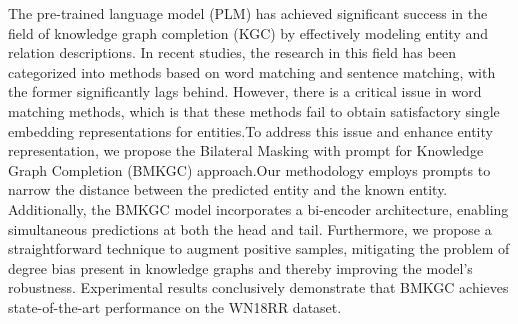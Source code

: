 The pre-trained language model (PLM) has achieved significant success in the field of knowledge graph completion (KGC) by effectively modeling entity and relation descriptions. In recent studies, the research in this field has been categorized into methods based on word matching and sentence matching, with the former significantly lags behind. However, there is a critical issue in word matching methods, which is that these methods fail to obtain satisfactory single embedding representations for entities.To address this issue and enhance entity representation, we propose the Bilateral Masking with prompt for Knowledge Graph Completion (BMKGC) approach.Our methodology employs prompts to narrow the distance between the predicted entity and the known entity. Additionally, the BMKGC model incorporates a bi-encoder architecture, enabling simultaneous predictions at both the head and tail. Furthermore, we propose a straightforward technique to augment positive samples, mitigating the problem of degree bias present in knowledge graphs and thereby improving the model's robustness. Experimental results conclusively demonstrate that BMKGC achieves state-of-the-art performance on the WN18RR dataset.